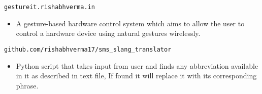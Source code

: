 




\nolinkurl{gestureit.rishabhverma.in}
\begin{itemize}
\item A gesture-based hardware control system which aims to allow the user to control a hardware device using natural gestures wirelessly.
\end{itemize}

\divider

\nolinkurl{github.com/rishabhverma17/sms_slang_translator}
\begin{itemize}
\item Python script that takes input from user and finds any abbreviation available in it as described in text file, If found it will replace it with its corresponding phrase.
\end{itemize}














\divider

